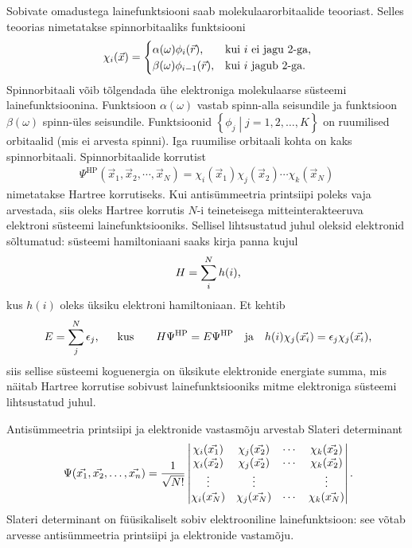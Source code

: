 \documentclass[12pt]{report}
\def\cparen#1{\left\{#1\right\}}
\begin{document}
Sobivate omadustega lainefunktsiooni saab molekulaarorbitaalide teooriast.
Selles teoorias nimetatakse spinnorbitaaliks funktsiooni
\begin{align}\label{eq:spinorb}
    \chi_i(\vec{x}) = \begin{cases}
        \alpha(\omega) \phi_i(\vec{r})\text{,} & \text{kui \(i\) ei jagu \(2\)-ga} \rlap{,}\\
        \beta(\omega) \phi_{i-1}(\vec{r})\text{,} & \text{kui \(i\) jagub \(2\)-ga} \rlap{.} \\
    \end{cases}
\end{align}
Spinnorbitaali võib tõlgendada ühe elektroniga molekulaarse süsteemi lainefunktsioonina.
Funktsioon \(\alpha(\omega)\) vastab spinn-alla seisundile ja funktsioon \(\beta(\omega)\) spinn-üles seisundile.
Funktsioonid \(\cparen{\phi_j \middle| j = 1,2, \ldots, K}\) on ruumilised orbitaalid (mis ei arvesta spinni).
Iga ruumilise orbitaali kohta on kaks spinn\-orbitaali.
Spinnorbitaalide korrutist
\begin{align}
    \Psi^\text{HP}(\vec{x}_1, \vec{x}_2, \cdots, \vec{x}_N) =
    \chi_i(\vec{x}_1) \chi_j(\vec{x}_2) \cdots \chi_k(\vec{x}_N)
\end{align}
nimetatakse Hartree korrutiseks.
Kui antisümmeetria printsiipi poleks vaja arvestada, siis oleks Hartree korrutis \(N\)-i teineteisega mitteinterakteeruva elektroni süsteemi lainefunktsiooniks.
Sellisel lihtsustatud juhul oleksid elektronid sõltumatud: süsteemi hamiltoniaani saaks kirja panna kujul
\begin{align}
    H = \sum_i^N h(i) \rlap{,}
\end{align}
kus \(h(i)\) oleks üksiku elektroni hamiltoniaan.
Et kehtib
\begin{align}
    E = \sum_j^N \epsilon_j \rlap{,}
    \qquad \text{kus} \qquad
    H \Psi^\text{HP} = E \Psi^\text{HP}
    \quad \text{ja} \quad
    h(i) \chi_j(\vec{x_i}) = \epsilon_j \chi_j(\vec{x_i}) \rlap{,}
\end{align}
siis sellise süsteemi koguenergia on üksikute elektronide energiate summa, mis näitab Hartree korrutise sobivust lainefunktsiooniks mitme elektroniga süsteemi lihtsustatud juhul.

Antisümmeetria printsiipi ja elektronide vastasmõju arvestab Slateri determinant
\begin{align}\label{eq:slater}
    \Psi(\vec{x_1}, \vec{x_2}, \ldots, \vec{x_n}) =
    \frac{1}{\sqrt{N!}} \begin{vmatrix}
        \chi_i(\vec{x_1}) & \chi_j(\vec{x_2}) & \cdots & \chi_k(\vec{x_2}) \\
        \chi_i(\vec{x_2}) & \chi_j(\vec{x_2}) & \cdots & \chi_k(\vec{x_2}) \\
        \vdots & \vdots & & \vdots \\
        \chi_i(\vec{x_N}) & \chi_j(\vec{x_N}) & \cdots & \chi_k(\vec{x_N}) \\
    \end{vmatrix} \rlap{.}
\end{align}
Slateri determinant on füüsikaliselt sobiv elektrooniline lainefunktsioon: see võtab arvesse antisümmeetria printsiipi ja elektronide vastamõju.
\end{document}
